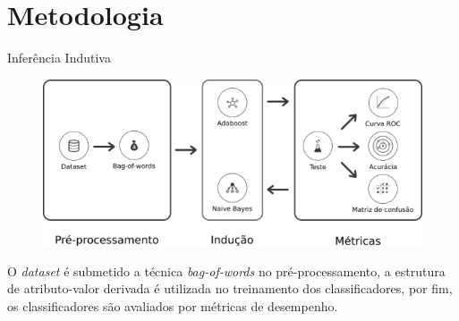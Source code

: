 \section{Metodologia}
    \begin{frame}[fragile]{Inferência Indutiva}
        \begin{figure}[H]
            \begin{center}
                \includegraphics[scale=0.50]{images/inferencia_indutiva.png}
            \end{center}
        \end{figure}
        
        O \textit{dataset} é submetido a técnica \textit{bag-of-words} no 
        pré-processamento, a estrutura de atributo-valor derivada é 
        utilizada no treinamento dos classificadores, por fim, os 
        classificadores são avaliados por métricas de desempenho.
    \end{frame}
